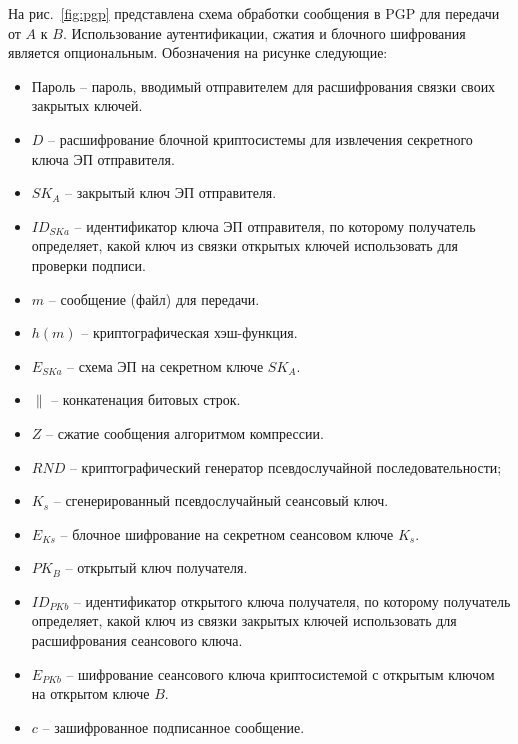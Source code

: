 На рис.~\ref{fig:pgp} представлена схема обработки сообщения в PGP для передачи от $A$ к $B$. Использование аутентификации, сжатия и блочного шифрования является опциональным. Обозначения на рисунке следующие:
\begin{itemize}
    \item Пароль -- пароль, вводимый отправителем для расшифрования связки своих закрытых ключей.
    \item $D$ -- расшифрование блочной криптосистемы для извлечения секретного ключа ЭП отправителя.
    \item $SK_A$ -- закрытый ключ ЭП отправителя.
    \item $ID_{SKa}$ -- идентификатор ключа ЭП отправителя, по которому получатель определяет, какой ключ из связки открытых ключей использовать для проверки подписи.
    \item $m$ -- сообщение (файл) для передачи.
    \item $h(m)$ -- криптографическая хэш-функция.
    \item $E_{SKa}$ -- схема ЭП на секретном ключе $SK_A$.
    \item $\|$ -- конкатенация битовых строк.
    \item $Z$ -- сжатие сообщения алгоритмом компрессии.
    \item $RND$ -- криптографический генератор псевдослучайной последовательности;
    \item $K_s$ -- сгенерированный псевдослучайный сеансовый ключ.
    \item $E_{Ks}$ -- блочное шифрование на секретном сеансовом ключе $K_s$.
    \item $PK_B$ -- открытый ключ получателя.
    \item $ID_{PKb}$ -- идентификатор открытого ключа получателя, по которому получатель определяет, какой ключ из связки закрытых ключей использовать для расшифрования сеансового ключа.
    \item $E_{PKb}$ -- шифрование сеансового ключа криптосистемой с открытым ключом на открытом ключе $B$.
    \item $c$ -- зашифрованное подписанное сообщение.
\end{itemize}
